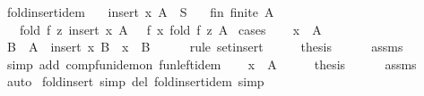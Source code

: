 \begin{isabellebody}
\isanewline
%
\endisadelimproof
\isanewline
{}\isamarkupfalse%
\ fold{\isacharunderscore}{\kern0pt}insert{\isacharunderscore}{\kern0pt}idem{\isacharcolon}{\kern0pt}\isanewline
\ \ \ {\isachardoublequoteopen}insert\ x\ A\ {\isasymsubseteq}\ S{\isachardoublequoteclose}\isanewline
\ \ \ fin{\isacharcolon}{\kern0pt}\ {\isachardoublequoteopen}finite\ A{\isachardoublequoteclose}\isanewline
\ \ \ {\isachardoublequoteopen}fold\ f\ z\ {\isacharparenleft}{\kern0pt}insert\ x\ A{\isacharparenright}{\kern0pt}\ \ {\isacharequal}{\kern0pt}\ f\ x\ {\isacharparenleft}{\kern0pt}fold\ f\ z\ A{\isacharparenright}{\kern0pt}{\isachardoublequoteclose}\isanewline
%
\isadelimproof
%
\endisadelimproof
%
\isatagproof
{}\isamarkupfalse%
\ cases\isanewline
\ \ \isamarkupfalse%
\ {\isachardoublequoteopen}x\ {\isasymin}\ A{\isachardoublequoteclose}\isanewline
\ \ \isamarkupfalse%
\ \isamarkupfalse%
\ B\ \ {\isachardoublequoteopen}A\ {\isacharequal}{\kern0pt}\ insert\ x\ B{\isachardoublequoteclose}\ \ {\isachardoublequoteopen}x\ {\isasymnotin}\ B{\isachardoublequoteclose}\isanewline
\ \ \ \ \isamarkupfalse%
\ {\isacharparenleft}{\kern0pt}rule\ set{\isacharunderscore}{\kern0pt}insert{\isacharparenright}{\kern0pt}\isanewline
\ \ \isamarkupfalse%
\ \isamarkupfalse%
\ {\isacharquery}{\kern0pt}thesis\isanewline
\ \ \ \ \isamarkupfalse%
\ assms\ \isamarkupfalse%
\ {\isacharparenleft}{\kern0pt}simp\ add{\isacharcolon}{\kern0pt}\ comp{\isacharunderscore}{\kern0pt}fun{\isacharunderscore}{\kern0pt}idem{\isacharunderscore}{\kern0pt}on\ fun{\isacharunderscore}{\kern0pt}left{\isacharunderscore}{\kern0pt}idem{\isacharparenright}{\kern0pt}\isanewline
{}\isamarkupfalse%
\isanewline
\ \ \isamarkupfalse%
\ {\isachardoublequoteopen}x\ {\isasymnotin}\ A{\isachardoublequoteclose}\isanewline
\ \ \isamarkupfalse%
\ \isamarkupfalse%
\ {\isacharquery}{\kern0pt}thesis\isanewline
\ \ \ \ \isamarkupfalse%
\ assms\ \isamarkupfalse%
\ auto\isanewline
{}\isamarkupfalse%
%
\endisatagproof
{\isafoldproof}%
%
\isadelimproof
\isanewline
%
\endisadelimproof
\isanewline
{}\isamarkupfalse%
\ fold{\isacharunderscore}{\kern0pt}insert\ {\isacharbrackleft}{\kern0pt}simp\ del{\isacharbrackright}{\kern0pt}\ fold{\isacharunderscore}{\kern0pt}insert{\isacharunderscore}{\kern0pt}idem\ {\isacharbrackleft}{\kern0pt}simp{\isacharbrackright}{\kern0pt}\isanewline

\end{isabellebody}
